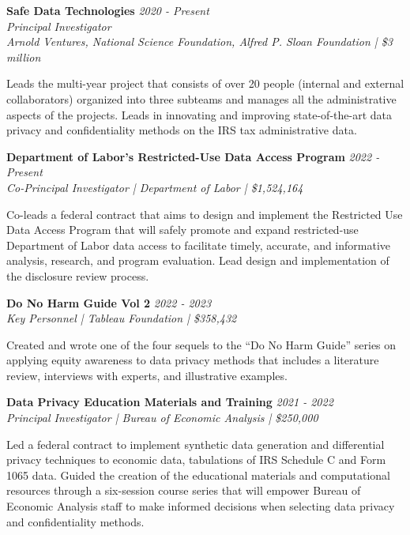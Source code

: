 \textbf{Safe Data Technologies} \hfill \textit{2020 - Present}\\
\textit{Principal Investigator}\\ 
\textit{Arnold Ventures, National Science Foundation, Alfred P. Sloan Foundation | \$3 million}

Leads the multi-year project that consists of over 20 people (internal and external collaborators) organized into three subteams and manages all the administrative aspects of the projects. Leads in innovating and improving state-of-the-art data privacy and confidentiality methods on the IRS tax administrative data.

\projectspace
\textbf{Department of Labor's Restricted-Use Data Access Program } \hfill \textit{2022 - Present}\\
\textit{Co-Principal Investigator | Department of Labor | \$1,524,164}

Co-leads a federal contract that aims to design and implement the Restricted Use Data Access Program that will safely promote and expand restricted-use Department of Labor data access to facilitate timely, accurate, and informative analysis, research, and program evaluation. Lead design and implementation of the disclosure review process. 

\projectspace
\textbf{Do No Harm Guide Vol 2} \hfill \textit{2022 - 2023}\\
\textit{Key Personnel | Tableau Foundation | \$358,432}

Created and wrote one of the four sequels to the ``Do No Harm Guide'' series on applying equity awareness to data privacy methods that includes a literature review, interviews with experts, and illustrative examples.

\projectspace
\textbf{Data Privacy Education Materials and Training } \hfill \textit{2021 - 2022}\\
\textit{Principal Investigator | Bureau of Economic Analysis | \$250,000}

Led a federal contract to implement synthetic data generation and differential privacy techniques to economic data, tabulations of IRS Schedule C and Form 1065 data. Guided the creation of the educational materials and computational resources through a six-session course series that will empower Bureau of Economic Analysis staff to make informed decisions when selecting data privacy and confidentiality methods.

